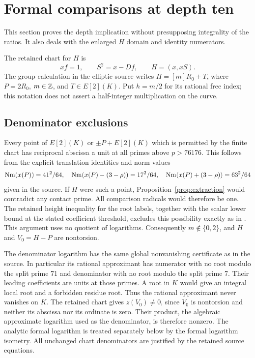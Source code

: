 \documentclass[11pt,a4paper]{article}
\theoremstyle{remark}\newtheorem{remark}[theorem]{Remark}
\begin{document}
\section{Formal comparisons at depth ten}\label{sec:formal}
This section proves the depth implication without presupposing
integrality of the ratios. It also deals with the enlarged $H$ domain
and identity numerators.

The retained chart for $H$ is
\[
 xf=1,\qquad S^2=x-Df,\qquad H=(x,xS).
\]
The group calculation in the elliptic source writes
$H=[m]R_0+T$, where $P=2R_0$, $m\in\mathbb Z$, and $T\in E[2](K)$.
Put $h=m/2$ for its rational free index; this notation does not
assert a half-integer multiplication on the curve.

\subsection{Denominator exclusions}
Every point of $E[2](K)$ or $\pm P+E[2](K)$ which is permitted by
the finite chart has reciprocal abscissa a unit at all primes above
$p>76176$. This follows from the explicit translation identities
and norm values
\[
 \operatorname{Nm}(x(P))=41^2/64,\quad
 \operatorname{Nm}(x(P)-(3-\rho))=17^2/64,\quad
 \operatorname{Nm}(x(P)+(3-\rho))=63^2/64
\]
given in the source. If $H$ were such a point,
Proposition~\ref{prop:extraction} would contradict any contact prime.
All comparison radicals would therefore be one. The retained height
inequality for the root labels, together with the scalar lower bound
at the stated coefficient threshold, excludes this possibility exactly
as in \cite{Explicit}. This argument uses no quotient of
logarithms. Consequently $m\notin\{0,2\}$, and $H$ and $V_0=H-P$
are nontorsion.

The denominator logarithm has the same global nonvanishing
certificate as in the source. In particular its rational approximant
has numerator with no root modulo the split prime 71 and denominator
with no root modulo the split prime 7. Their leading coefficients are
units at those primes. A root in $K$ would give an integral local root
and a forbidden residue root. Thus the rational approximant never vanishes on $K$. The retained
chart gives $z(V_0)\ne0$, since $V_0$ is nontorsion and neither its
abscissa nor its ordinate is zero. Their product, the algebraic
approximate logarithm used as the denominator, is therefore nonzero.
The analytic formal logarithm is treated separately below by the
formal logarithm isometry. All unchanged chart denominators are
justified by the retained source equations.
\end{document}
